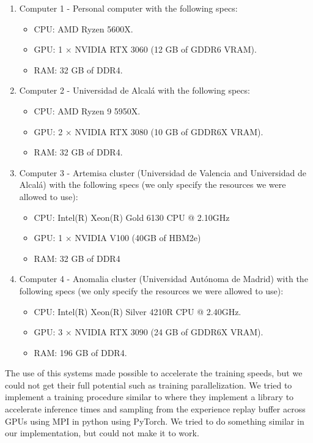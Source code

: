 \begin{enumerate}
	\item Computer 1 - Personal computer with the following specs:
	\begin{itemize}
		\item CPU: AMD Ryzen 5600X.
		\item GPU: 1 $\times$ NVIDIA RTX 3060 (12 GB of GDDR6 VRAM).
		\item RAM: 32 GB of DDR4.
	\end{itemize}
	\item Computer 2 - Universidad de Alcalá with the following specs:
	\begin{itemize}
		\item CPU: AMD Ryzen 9 5950X.
		\item GPU: 2 $\times$ NVIDIA RTX 3080 (10 GB of GDDR6X VRAM).
		\item RAM: 32 GB of DDR4.
	\end{itemize} 
	\item Computer 3 - Artemisa cluster (Universidad de Valencia and Universidad de Alcalá) with the following specs (we only specify the resources we were allowed to use):
	\begin{itemize}
		\item CPU: Intel(R) Xeon(R) Gold 6130 CPU @ 2.10GHz
		\item GPU: 1 $\times$ NVIDIA V100 (40GB of HBM2e)
		\item RAM: 32 GB of DDR4
	\end{itemize} 
	\item Computer 4 - Anomalia cluster (Universidad Autónoma de Madrid) with the following specs (we only specify the resources we were allowed to use):
	\begin{itemize}
		\item CPU: Intel(R) Xeon(R) Silver 4210R CPU @ 2.40GHz.
		\item GPU: 3 $\times$ NVIDIA RTX 3090 (24 GB of GDDR6X VRAM).
		\item RAM: 196 GB of DDR4.
	\end{itemize} 
\end{enumerate}

The use of this systems made possible to accelerate the training speeds, but we could not get their full potential such as training parallelization. We tried to implement a training procedure similar to \cite{stooke2019rlpyt} where they implement a library to accelerate inference times and sampling from the experience replay buffer across GPUs using MPI \cite{gropp_using_1994} in python using PyTorch. We tried to do something similar in our implementation, but could not make it to work.


